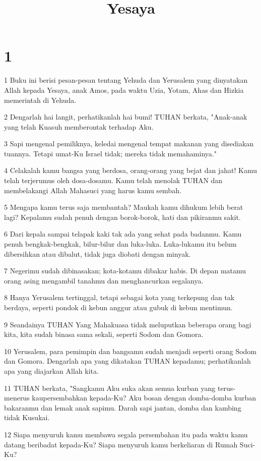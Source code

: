 

\title{Yesaya}


\chapter{1}

\par 1 Buku ini berisi pesan-pesan tentang Yehuda dan Yerusalem yang dinyatakan Allah kepada Yesaya, anak Amos, pada waktu Uzia, Yotam, Ahas dan Hizkia memerintah di Yehuda.
\par 2 Dengarlah hai langit, perhatikanlah hai bumi! TUHAN berkata, "Anak-anak yang telah Kuasuh memberontak terhadap Aku.
\par 3 Sapi mengenal pemiliknya, keledai mengenal tempat makanan yang disediakan tuannya. Tetapi umat-Ku Israel tidak; mereka tidak memahaminya."
\par 4 Celakalah kamu bangsa yang berdosa, orang-orang yang bejat dan jahat! Kamu telah terjerumus oleh dosa-dosamu. Kamu telah menolak TUHAN dan membelakangi Allah Mahasuci yang harus kamu sembah.
\par 5 Mengapa kamu terus saja membantah? Maukah kamu dihukum lebih berat lagi? Kepalamu sudah penuh dengan borok-borok, hati dan pikiranmu sakit.
\par 6 Dari kepala sampai telapak kaki tak ada yang sehat pada badanmu. Kamu penuh bengkak-bengkak, bilur-bilur dan luka-luka. Luka-lukamu itu belum dibersihkan atau dibalut, tidak juga diobati dengan minyak.
\par 7 Negerimu sudah dibinasakan; kota-kotamu dibakar habis. Di depan matamu orang asing mengambil tanahmu dan menghancurkan segalanya.
\par 8 Hanya Yerusalem tertinggal, tetapi sebagai kota yang terkepung dan tak berdaya, seperti pondok di kebun anggur atau gubuk di kebun mentimun.
\par 9 Seandainya TUHAN Yang Mahakuasa tidak meluputkan beberapa orang bagi kita, kita sudah binasa sama sekali, seperti Sodom dan Gomora.
\par 10 Yerusalem, para pemimpin dan bangsamu sudah menjadi seperti orang Sodom dan Gomora. Dengarlah apa yang dikatakan TUHAN kepadamu; perhatikanlah apa yang diajarkan Allah kita.
\par 11 TUHAN berkata, "Sangkamu Aku suka akan semua kurban yang terus-menerus kaupersembahkan kepada-Ku? Aku bosan dengan domba-domba kurban bakaranmu dan lemak anak sapimu. Darah sapi jantan, domba dan kambing tidak Kusukai.
\par 12 Siapa menyuruh kamu membawa segala persembahan itu pada waktu kamu datang beribadat kepada-Ku? Siapa menyuruh kamu berkeliaran di Rumah Suci-Ku?
